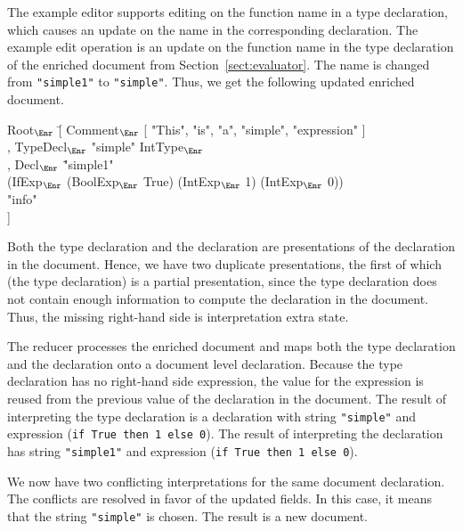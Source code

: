 The example editor supports editing on the function name in a type declaration, which causes an update on the name in the corresponding declaration. 
The example edit operation is an update on the function name in the type declaration of the enriched document from Section~\ref{sect:evaluator}. The name is changed from \verb|"simple1"| to \verb|"simple"|. Thus, we get the following updated enriched document.

\small \ttfamily
\begin{tabbing}
Root$_{\Enr}$ \= [ Comment$_{\Enr}$ [ "This", "is", "a", "simple", "expression" ]\\
       \> , TypeDecl$_{\Enr}$ "simple" IntType$_{\Enr}$\\
       \> , Decl$_{\Enr}$ \= "simple1"\\
       \>                       \> (IfExp$_{\Enr}$ (BoolExp$_{\Enr}$ True) (IntExp$_{\Enr}$ 1) (IntExp$_{\Enr}$ 0)) \\
       \>                       \> "info"\\
       \> ] 
\end{tabbing}
\rmfamily \normalsize

Both the type declaration and the declaration are presentations of the declaration in the document. Hence, we have two duplicate presentations, the first of which (the type declaration) is a partial presentation, since the type declaration does not contain enough information to compute the declaration in the document. Thus, the missing right-hand side is interpretation extra state.

The reducer processes the enriched document and maps both the type declaration and the declaration onto a document level declaration. Because the type declaration has no right-hand side expression, the value for the expression is reused from the previous value of the declaration in the document. The result of interpreting the type declaration is a declaration with string 
\verb|"simple"| and expression (\verb|if True then 1 else 0|). The result of interpreting the declaration has string \verb|"simple1"| and expression (\verb|if True then 1 else 0|).

We now have two conflicting interpretations for the same document declaration. The conflicts are resolved in favor of the updated fields. In this case, it means that the string \verb|"simple"| is chosen. The result is a new document.

